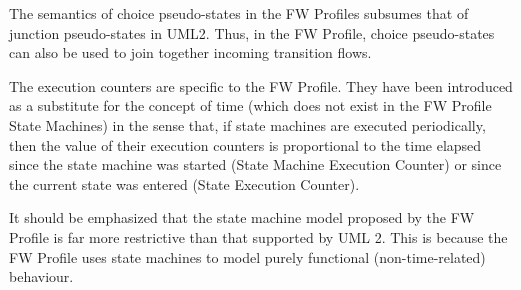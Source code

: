 \begin{fw_itemize}
\item The semantics of choice pseudo-states in the FW Profiles subsumes that of junction pseudo-states
in UML2. Thus, in the FW Profile, choice pseudo-states can also be used to join together incoming
transition flows.
\item The execution counters are specific to the FW Profile. They have been introduced as a
substitute for the concept of time (which does not exist in the FW Profile State Machines) in
the sense that, if state machines are executed periodically, then the value of their execution 
counters is proportional to the time elapsed since the state machine was started (State Machine
Execution Counter) or since the current state was entered (State Execution Counter). 
\end{fw_itemize}

It should be emphasized that the state machine model proposed by the FW Profile is far more
restrictive than that supported by UML 2. This is because the FW Profile uses state machines
to model purely functional (non-time-related) behaviour.

